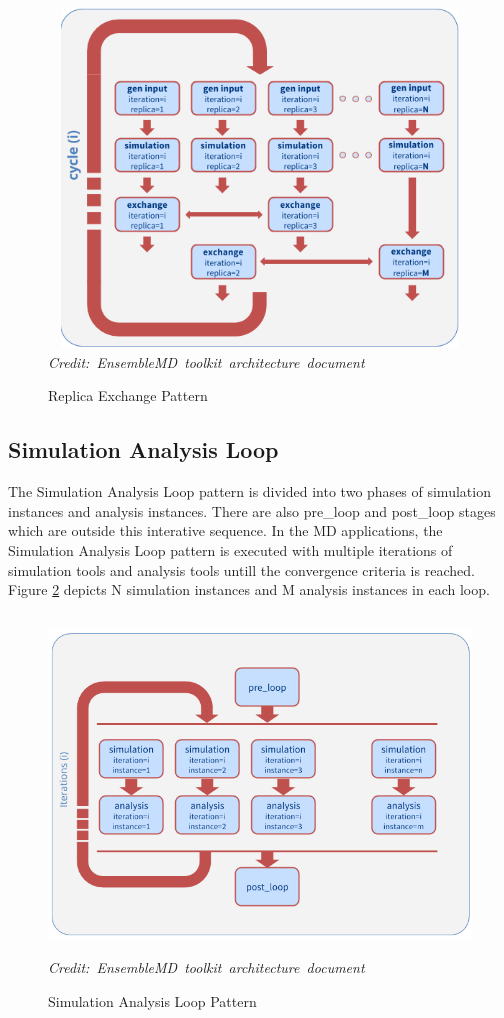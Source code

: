 \documentclass[10pt]{ruthesis}
\begin{document}
\begin{figure}
  \centering
  \includegraphics[width=12cm,height=9cm]{repex.png}
  \hbox{\small\itshape Credit: EnsembleMD toolkit architecture document \cite{site1}}
  \caption{Replica Exchange Pattern}
  \label{fig:repex1}
\end{figure}

\subsection{Simulation Analysis Loop}
The Simulation Analysis Loop pattern is divided into two phases of simulation instances and analysis instances. There are also pre\_loop and post\_loop stages which are outside this interative sequence. In the MD applications, the Simulation Analysis Loop pattern is executed with multiple iterations of simulation tools and analysis tools untill the convergence criteria is reached. Figure \ref{fig:sal} depicts N simulation instances and M analysis instances in each loop.

\begin{figure}
  \centering
  \includegraphics[width=12cm,height=9cm]{sal.png}
  \hbox{\small\itshape Credit: EnsembleMD toolkit architecture document \cite{site1}}
  \caption{Simulation Analysis Loop Pattern}
  \label{fig:sal}
\end{figure}
\end{document}

